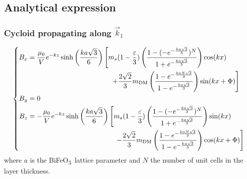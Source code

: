 \documentclass[a4paper,12pt]{article}
\newcommand{\BFO}{BiFeO\textsubscript{3}\ }
\begin{document}
\subsection{Analytical expression}

\subsubsection{Cycloid propagating along $\vec{k}_1$}

\begin{equation*}
    \left \lbrace
      \begin{aligned}
        B_x & = \frac{\mu_0}{V}  e^{-k z} \sinh \left(\frac{ka\sqrt{3}}{6}\right) \left[ m_s(1-\frac{\varepsilon}{3})  \left(\frac{1-(-e^{-\frac{ka\sqrt{3}}{3}})^N}{1+e^{-\frac{ka\sqrt{3}}{3}}}\right) \cos(kx) \right. \\ & \left. \hspace*{42mm} + \frac{2\sqrt{2}}{3} m_\text{DM}  \left(\frac{1-e^{-\frac{kaN\sqrt{3}}{3}}}{1-e^{-\frac{ka\sqrt{3}}{3}}}\right) \sin(kx+\Phi) \right] \\
        B_y &= 0 \\
        B_z & = -\frac{\mu_0}{V} e^{-k z} \sinh\left( \frac{ka\sqrt{3}}{6}\right) \left[ m_s(1-\frac{\varepsilon}{3})  \left(\frac{1-(-e^{-\frac{ka\sqrt{3}}{3}})^N}{1+e^{-\frac{ka\sqrt{3}}{3}}}\right) \sin(kx) \right. \\ & \left. \hspace*{44mm} - \frac{2\sqrt{2}}{3} m_\text{DM} \left(\frac{1-e^{-\frac{kaN\sqrt{3}}{3}}}{1-e^{-\frac{ka\sqrt{3}}{3}}}\right) \cos(kx+\Phi) \right] \\
      \end{aligned}
    \right.
\end{equation*}
where $a$ is the \BFO lattice parameter and $N$ the number of unit cells in the layer thickness.
\end{document}
